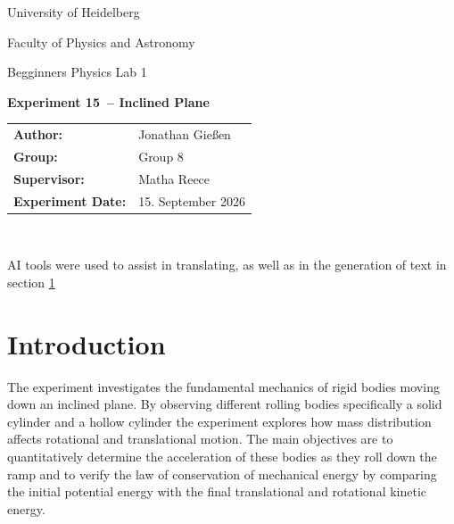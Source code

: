 \documentclass[12pt,a4paper,titlepage]{scrartcl}
\numberwithin{equation}{section}
\numberwithin{table}{section}
\numberwithin{figure}{section}
\newcommand{\versuch}{Experiment 15}
\newcommand{\titel}{Inclined Plane}
\newcommand{\praktikum}{Begginners Physics Lab 1}
\newcommand{\autor}{Jonathan Gießen}
\newcommand{\gruppe}{Group 8}
\newcommand{\datum}{15. September 2026}
\newcommand{\betreuer}{Matha Reece}
\begin{document}
\pagestyle{scrheadings}

\begin{titlepage}



    \centering
    \vspace*{4cm}
    {\large University of Heidelberg\par}
    {\small Faculty of Physics and Astronomy\par}
    {\Large \praktikum\par}
    \vspace{0.8cm}
    {\LARGE \bfseries \versuch\ -- \titel\par}
    \vspace{1.5cm}

    \begin{tabular}{ll}
        \textbf{Author:} & \autor\\
        \textbf{Group:} & \gruppe\\
        \textbf{Supervisor:} & \betreuer\\
        \textbf{Experiment Date:} & \datum\\
    \end{tabular}

    \vfill
    \hrulefill\
\end{titlepage}

\tableofcontents

\bigskip
\begin{tcolorbox}[colback=gray!5,colframe=gray!60,boxrule=0.8pt,arc=0.01mm,title=AI-Disclaimer]
    AI tools were used to assist in translating, as well as in the generation of text in section \ref{sec:Einleitung}
\end{tcolorbox}

\clearpage



\section{Introduction}\label{sec:Einleitung}
The experiment investigates the fundamental mechanics of rigid bodies moving down an inclined plane. By observing different rolling bodies specifically a solid cylinder and a hollow cylinder the experiment explores how mass distribution affects rotational and translational motion. The main objectives are to quantitatively determine the acceleration of these bodies as they roll down the ramp and to verify the law of conservation of mechanical energy by comparing the initial potential energy with the final translational and rotational kinetic energy.
\end{document}
